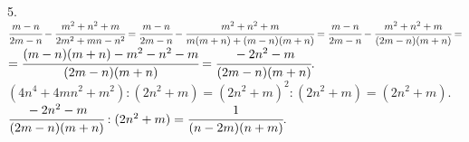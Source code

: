 5. $\cfrac{m-n}{2m-n}-\cfrac{m^2+n^2+m}{2m^2+mn-n^2}=\cfrac{m-n}{2m-n}-\cfrac{m^2+n^2+m}{m(m+n)+(m-n)(m+n)}=\cfrac{m-n}{2m-n}-\cfrac{m^2+n^2+m}{(2m-n)(m+n)}=$\\
$=\cfrac{(m-n)(m+n)-m^2-n^2-m}{(2m-n)(m+n)}=\cfrac{-2n^2-m}{(2m-n)(m+n)}.$\\
$(4n^4+4mn^2+m^2):(2n^2+m)=(2n^2+m)^2:(2n^2+m)=(2n^2+m).$\\
$\cfrac{-2n^2-m}{(2m-n)(m+n)}:(2n^2+m)=\cfrac{1}{(n-2m)(n+m)}.$\\
